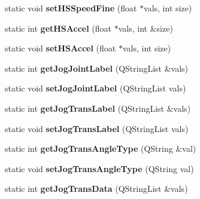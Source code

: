 \begin{DoxyCompactItemize}
\item 
\hypertarget{classRobotConf_aec27ec17eb5c0c1d2fad4d6098b6879d}{static void {\bfseries set\-H\-S\-Speed\-Fine} (float $\ast$vals, int size)}\label{classRobotConf_aec27ec17eb5c0c1d2fad4d6098b6879d}

\item 
\hypertarget{classRobotConf_a5dfe176f10faa03180e5d6e016c07d88}{static int {\bfseries get\-H\-S\-Accel} (float $\ast$vals, int \&size)}\label{classRobotConf_a5dfe176f10faa03180e5d6e016c07d88}

\item 
\hypertarget{classRobotConf_a0a7d1e5e65b7fedb781fb2ffe4cd04c4}{static void {\bfseries set\-H\-S\-Accel} (float $\ast$vals, int size)}\label{classRobotConf_a0a7d1e5e65b7fedb781fb2ffe4cd04c4}

\item 
\hypertarget{classRobotConf_af49a01ce24091e4fe357f6a415f43111}{static int {\bfseries get\-Jog\-Joint\-Label} (Q\-String\-List \&vals)}\label{classRobotConf_af49a01ce24091e4fe357f6a415f43111}

\item 
\hypertarget{classRobotConf_ad0d60f8480230c9a02187728838d5911}{static void {\bfseries set\-Jog\-Joint\-Label} (Q\-String\-List vals)}\label{classRobotConf_ad0d60f8480230c9a02187728838d5911}

\item 
\hypertarget{classRobotConf_a7da0d859200f2c7de0f7e0e583c49cad}{static int {\bfseries get\-Jog\-Trans\-Label} (Q\-String\-List \&vals)}\label{classRobotConf_a7da0d859200f2c7de0f7e0e583c49cad}

\item 
\hypertarget{classRobotConf_a99f05e56d88c7c036998666bf8fc2ff6}{static void {\bfseries set\-Jog\-Trans\-Label} (Q\-String\-List vals)}\label{classRobotConf_a99f05e56d88c7c036998666bf8fc2ff6}

\item 
\hypertarget{classRobotConf_af65c50d3591f1e2a0456cb32ee7e673b}{static int {\bfseries get\-Jog\-Trans\-Angle\-Type} (Q\-String \&val)}\label{classRobotConf_af65c50d3591f1e2a0456cb32ee7e673b}

\item 
\hypertarget{classRobotConf_a146855e9f951be604426eaa1cb5f5694}{static void {\bfseries set\-Jog\-Trans\-Angle\-Type} (Q\-String val)}\label{classRobotConf_a146855e9f951be604426eaa1cb5f5694}

\item 
\hypertarget{classRobotConf_ac87ad9dbd326ab80895fb33ee88f52fc}{static int {\bfseries get\-Jog\-Trans\-Data} (Q\-String\-List \&vals)}\label{classRobotConf_ac87ad9dbd326ab80895fb33ee88f52fc}


\end{DoxyCompactItemize}
